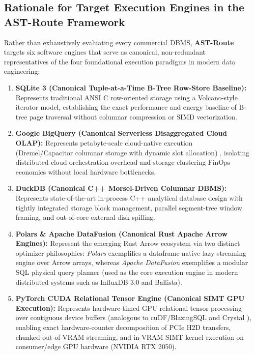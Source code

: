 \documentclass[10pt,a4paper]{article}
\begin{document}
\subsection{Rationale for Target Execution Engines in the AST-Route Framework}
Rather than exhaustively evaluating every commercial DBMS, \textbf{AST-Route} targets six software engines that serve as canonical, non-redundant representatives of the four foundational execution paradigms in modern data engineering:
\begin{enumerate}[leftmargin=1.5em,itemsep=2pt]
    \item \textbf{SQLite 3 (Canonical Tuple-at-a-Time B-Tree Row-Store Baseline):} Represents traditional ANSI C row-oriented storage using a Volcano-style iterator model, establishing the exact performance and energy baseline of B-tree page traversal without columnar compression or SIMD vectorization.
    \item \textbf{Google BigQuery (Canonical Serverless Disaggregated Cloud OLAP):} Represents petabyte-scale cloud-native execution (Dremel/Capacitor columnar storage with dynamic slot allocation) \cite{melnik2020dremel}, isolating distributed cloud orchestration overhead and storage clustering FinOps economics without local hardware bottlenecks.
    \item \textbf{DuckDB (Canonical C++ Morsel-Driven Columnar DBMS):} Represents state-of-the-art in-process C++ analytical database design \cite{raasveldt2019duckdb,kuiper2024duckdb_ooc} with tightly integrated storage block management, parallel segment-tree window framing, and out-of-core external disk spilling.
    \item \textbf{Polars \& Apache DataFusion (Canonical Rust Apache Arrow Engines):} Represent the emerging Rust Arrow ecosystem via two distinct optimizer philosophies: \emph{Polars} exemplifies a dataframe-native lazy streaming engine over Arrow arrays, whereas \emph{Apache DataFusion} \cite{lamb2024datafusion} exemplifies a modular SQL physical query planner (used as the core execution engine in modern distributed systems such as InfluxDB 3.0 and Ballista).
    \item \textbf{PyTorch CUDA Relational Tensor Engine (Canonical SIMT GPU Execution):} Represents hardware-timed GPU relational tensor processing over contiguous device buffers (analogous to cuDF/BlazingSQL \cite{kim2022blazingsql} and Crystal \cite{shanbhag2020crystal}), enabling exact hardware-counter decomposition of PCIe H2D transfers, chunked out-of-VRAM streaming, and in-VRAM SIMT kernel execution on consumer/edge GPU hardware (NVIDIA RTX 2050).
\end{enumerate}
\end{document}
